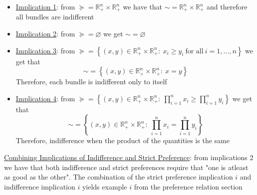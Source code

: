 \documentclass{article}
\begin{document}
  \begin{itemize}
    \item  \underline{Implication 1}: from $\succeq = \mathbb{R}_{+}^{n} \times \mathbb{R}_{+}^{n}$ we have that $\sim = \mathbb{R}_{+}^{n} \times \mathbb{R}_{+}^{n}$ and therefore all bundles are indifferent
    \item  \underline{Implication 2}: from $\succeq = \varnothing$ we get $\sim = \varnothing$
    \item  \underline{Implication 3}: from $\succeq = \left\{ (x,y) \in \mathbb{R}_{+}^{n} \times \mathbb{R}_{+}^{n}: \ x_{i} \geq y_{i} \ \text{for all} \ i = 1, \dots, n \right\}$ we get that $$\sim= \left\{ (x,y) \in \mathbb{R}_{+}^{n} \times \mathbb{R}_{+}^{n}: \ x = y \right\}$$Therefore, each bundle is indifferent only to itself
    \item  \underline{Implication 4}: from $\succeq = \left\{ (x,y) \in \mathbb{R}_{+}^{n} \times \mathbb{R}_{+}^{n}: \ \prod_{i=1}^{n} x_{i} \geq \prod_{i=1}^{n} y_{i} \right\}$ we get that $$\sim = \left\{ (x,y) \in \mathbb{R}_{+}^{n} \times \mathbb{R}_{+}^{n}: \ \prod_{i=1}^{n} x_{i} = \prod_{i=1}^{n} y_{i} \right\}$$ Therefore, indifference when the product of the quantities is the same
  \end{itemize}
  \par
  \underline{Combining Implications of Indifference and Strict Preference}: from implications 2 we have that both indifference and strict preferences require that "one is atleast as good as the other". The combination of the strict preference implication $i$ and indifference implication $i$ yields example $i$ from the preference relation section \par
\vspace{6mm}
\end{document}
